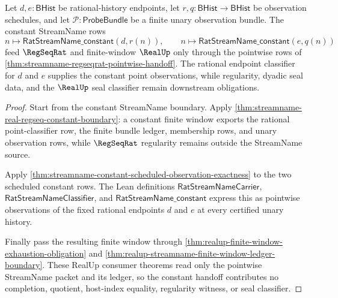 \begin{theorem}
\label{thm:streamname-realup-constant-observation-handoff}
Let $d,e:\mathsf{BHist}$ be rational-history endpoints, let
$r,q:\mathsf{BHist}\to\mathsf{BHist}$ be observation schedules, and let
$\mathcal{P}:\mathsf{ProbeBundle}$ be a finite unary observation bundle. The
constant StreamName rows
$$
n\mapsto \mathsf{RatStreamName\_constant}(d,r(n)),
\qquad
n\mapsto \mathsf{RatStreamName\_constant}(e,q(n))
$$
feed $\RegSeqRat$ and finite-window $\RealUp$ only through the pointwise rows
of \autoref{thm:streamname-regseqrat-pointwise-handoff}. The rational endpoint
classifier for $d$ and $e$ supplies the constant point observations, while
regularity, dyadic seal data, and the $\RealUp$ seal classifier remain
downstream obligations.
\end{theorem}
\begin{proof}
Start from the constant StreamName boundary. Apply
\autoref{thm:streamname-real-regseq-constant-boundary}: a constant finite
window exports the rational point-classifier row, the finite bundle ledger,
membership rows, and unary observation rows, while $\RegSeqRat$ regularity
remains outside the StreamName source.

Apply
\autoref{thm:streamname-constant-scheduled-observation-exactness} to the two
scheduled constant rows. The Lean definitions
$\mathsf{RatStreamNameCarrier}$, $\mathsf{RatStreamNameClassifier}$, and
$\mathsf{RatStreamName\_constant}$ express this as pointwise observations of
the fixed rational endpoints $d$ and $e$ at every certified unary history.

Finally pass the resulting finite window through
\autoref{thm:realup-finite-window-exhaustion-obligation} and
\autoref{thm:realup-streamname-finite-window-ledger-boundary}. These RealUp
consumer theorems read only the pointwise StreamName packet and its ledger, so
the constant handoff contributes no completion, quotient, host-index equality,
regularity witness, or seal classifier.
\end{proof}

